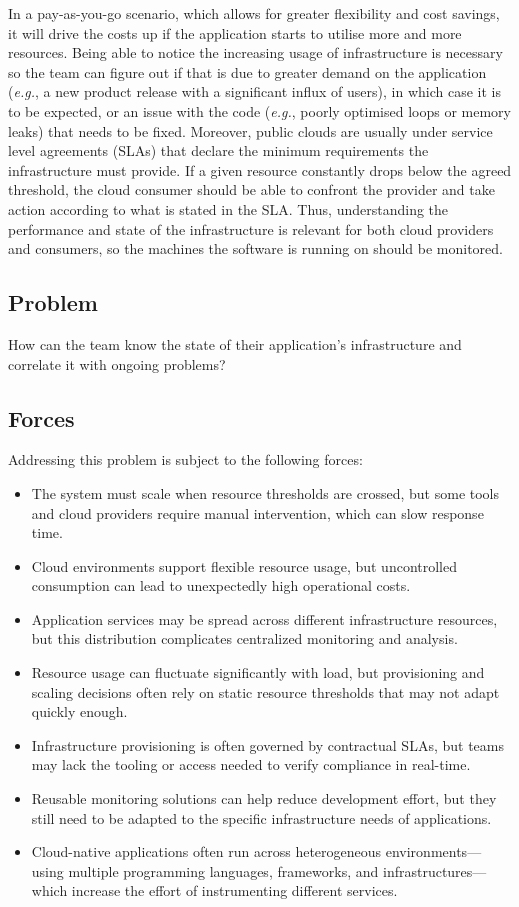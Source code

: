 \documentclass[runningheads]{llncs}
\begin{document}
In a pay-as-you-go scenario, which allows for greater flexibility and cost savings, it will drive the costs up if the application starts to utilise more and more resources. Being able to notice the increasing usage of infrastructure is necessary so the team can figure out if that is due to greater demand on the application (\textit{e.g.}, a new product release with a significant influx of users), in which case it is to be expected, or an issue with the code (\textit{e.g.}, poorly optimised loops or memory leaks) that needs to be fixed. Moreover, public clouds are usually under service level agreements (SLAs) that declare the minimum requirements the infrastructure must provide. If a given resource constantly drops below the agreed threshold, the cloud consumer should be able to confront the provider and take action according to what is stated in the SLA. Thus, understanding the performance and state of the infrastructure is relevant for both cloud providers and consumers, so the machines the software is running on should be monitored.

\subsection{Problem}
How can the team know the state of their application's infrastructure and correlate it with ongoing problems?

\subsection{Forces}
Addressing this problem is subject to the following forces:

\begin{itemize}
    \item The system must scale when resource thresholds are crossed, but some tools and cloud providers require manual intervention, which can slow response time.
    \item Cloud environments support flexible resource usage, but uncontrolled consumption can lead to unexpectedly high operational costs.
    \item Application services may be spread across different infrastructure resources, but this distribution complicates centralized monitoring and analysis.
    \item Resource usage can fluctuate significantly with load, but provisioning and scaling decisions often rely on static resource thresholds that may not adapt quickly enough.
    \item Infrastructure provisioning is often governed by contractual SLAs, but teams may lack the tooling or access needed to verify compliance in real-time.
    \item Reusable monitoring solutions can help reduce development effort, but they still need to be adapted to the specific infrastructure needs of applications.
    \item Cloud-native applications often run across heterogeneous environments---using multiple programming languages, frameworks, and infrastructures---which increase the effort of instrumenting different services.    
\end{itemize}
\end{document}
